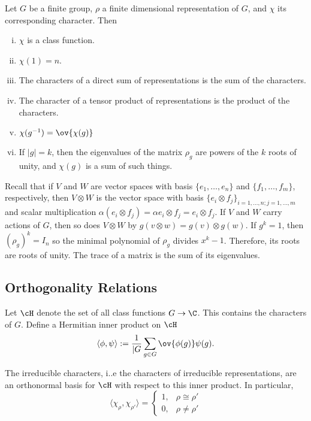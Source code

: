 \begin{prop}
Let $G$ be a finite group, $\rho$ a finite dimensional representation of $G$, and $\chi$ its corresponding character. Then
	\begin{enumerate}[(i)]
	\item $\chi$ is a class function.
	\item $\chi(1)=n$.
	\item The characters of a direct sum of representations is the sum of the characters.
	\item The character of a tensor product of representations is the product of the characters.	
	\item $\chi(g^{-1})=\ov{\chi(g)}$
	\item If $|g|=k$, then the eigenvalues of the matrix $\rho_g$ are powers of the $k$ roots of unity, and $\chi(g)$ is a sum of such things.
	\end{enumerate}
\end{prop}


Recall that if $V$ and $W$ are vector spaces with basis $\{e_1,\ldots,e_n\}$ and $\{f_1,\ldots,f_m\}$, respectively, then $V \otimes W$ is the vector space with basis $\{e_i \otimes f_j \}_{i=1,\ldots,n; j=1,\ldots,m}$ and scalar multiplication $\alpha(e_i \otimes f_j) = \alpha e_i \otimes f_j= e_i \otimes f_j$. If $V$ and $W$ carry actions of $G$, then so does $V \otimes W$ by $g(v\otimes w)= g(v) \otimes g(w)$. 
If $g^k=1$, then $(\rho_g)^k=I_n$ so the minimal polynomial of $\rho_g$ divides $x^k-1$. Therefore, its roots are roots of unity. The trace of a matrix is the sum of its eigenvalues.




\subsection{Orthogonality Relations}


Let $\cH$ denote the set of all class functions $G \to \C$. This contains the characters of $G$. Define a Hermitian inner product on $\cH$
	\[
	\langle \phi, \psi \rangle:= \dfrac{1}{|G} \sum_{g \in G} \ov{\phi(g)} \psi(g).
	\]



\begin{thm}
The irreducible characters, i..e the characters of irreducible representations, are an orthonormal basis for $\cH$ with respect to this inner product. In particular,
	\[
	\langle \chi_\rho, \chi_{\rho'} \rangle =
	\begin{cases}
	1, & \rho \cong \rho' \\
	0, & \rho \neq \rho'
	\end{cases}
	\]
\end{thm}

